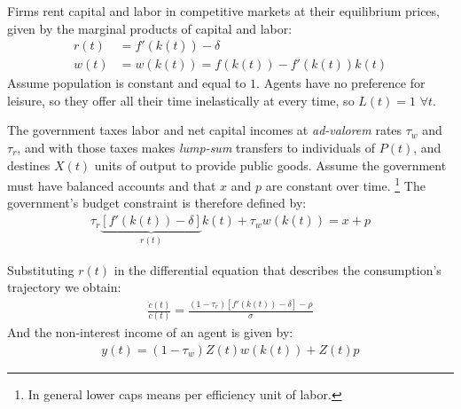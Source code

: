 \documentclass[aspectratio=169]{beamer}
\begin{document}
\begin{frame}
    
    Firms rent capital and labor in competitive markets at their equilibrium prices, given by the marginal products of capital and labor:
    \begin{align}
        r(t) &= f'(k(t))-\delta\\
        w(t) &= w(k(t)) = f(k(t))-f'(k(t))k(t)
    \end{align}
    Assume population is constant and equal to $1$. Agents have no preference for leisure, so they offer all their time inelastically at every time, so $L(t)=1$ $\forall t$.
\end{frame}

\begin{frame}
    The government taxes labor and net capital incomes at \emph{ad-valorem} rates $\tau_w$ and $\tau_r$, and with those taxes makes \emph{lump-sum} transfers to individuals of $P(t)$, and destines $X(t)$ units of output to provide public goods. Assume the government must have balanced accounts and that $x$ and $p$ are constant over time. \footnote{In general lower caps means per efficiency unit of labor.} The government's budget constraint is therefore defined by:
    \begin{align}
        \tau_r\underbrace{[f'(k(t))-\delta]}_{r(t)}k(t)+\tau_w w(k(t))=x+p
    \end{align}
\end{frame}

\begin{frame}
    Substituting $r(t)$ in the differential equation that describes the consumption's trajectory we obtain:
    \begin{align}
        \frac{\dot{c}(t)}{c(t)}=\frac{(1-\tau_r)[f'(k(t))-\delta]-\rho}{\sigma}
    \end{align}
    And the non-interest income of an agent is given by:
    \begin{align}
        y(t)=(1-\tau_w)Z(t)w(k(t))+Z(t)p
    \end{align}
\end{frame}
\end{document}
